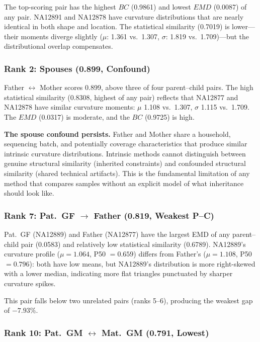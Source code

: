\documentclass{../yalumba}
\begin{document}
The top-scoring pair has the highest $BC$ (0.9861) and lowest $EMD$ (0.0087)
of any pair.  NA12891 and NA12878 have curvature distributions that are
nearly identical in both shape and location.  The statistical similarity
(0.7019) is lower---their moments diverge slightly ($\mu$: 1.361 vs.\ 1.307,
$\sigma$: 1.819 vs.\ 1.709)---but the distributional overlap compensates.

\subsubsection{Rank 2: Spouses (0.899, Confound)}

Father $\leftrightarrow$ Mother scores 0.899, above three of four
parent--child pairs.  The high statistical similarity (0.8308, highest of
any pair) reflects that NA12877 and NA12878 have similar curvature moments:
$\mu$ 1.108 vs.\ 1.307, $\sigma$ 1.115 vs.\ 1.709.  The $EMD$ (0.0317)
is moderate, and the $BC$ (0.9725) is high.

\begin{limitation}
\textbf{The spouse confound persists.}  Father and Mother share a household,
sequencing batch, and potentially coverage characteristics that produce
similar intrinsic curvature distributions.  Intrinsic methods cannot
distinguish between genuine structural similarity (inherited constraints)
and confounded structural similarity (shared technical artifacts).  This is
the fundamental limitation of any method that compares samples without
an explicit model of what inheritance should look like.
\end{limitation}

\subsubsection{Rank 7: Pat.~GF $\to$ Father (0.819, Weakest P--C)}

Pat.~GF (NA12889) and Father (NA12877) have the largest EMD of any
parent--child pair (0.0583) and relatively low statistical similarity
(0.6789).  NA12889's curvature profile ($\mu = 1.064$, P50 $= 0.659$)
differs from Father's ($\mu = 1.108$, P50 $= 0.796$): both have low means,
but NA12889's distribution is more right-skewed with a lower median,
indicating more flat triangles punctuated by sharper curvature spikes.

This pair falls below two unrelated pairs (ranks 5--6), producing the
weakest gap of $-7.93\%$.

\subsubsection{Rank 10: Pat.~GM $\leftrightarrow$ Mat.~GM (0.791, Lowest)}
\end{document}
